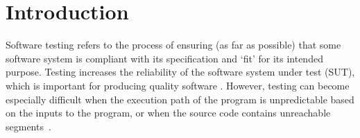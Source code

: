 \documentclass[runningheads]{llncs}
\begin{document}
\begin{abstract}

\end{abstract}

\section{Introduction}
Software testing \cite{AMMOFF} refers to the process of ensuring (as far as possible) that some software system  
is compliant with its specification and `fit' for its intended purpose. Testing increases the reliability of the software system under test (SUT), which is important for producing quality software \cite{anand2019importance}. However, testing can become especially difficult when the execution path of the program is unpredictable based on the inputs to the program, or when the source code contains unreachable segments~\cite{whittaker2002software}. 
\end{document}
